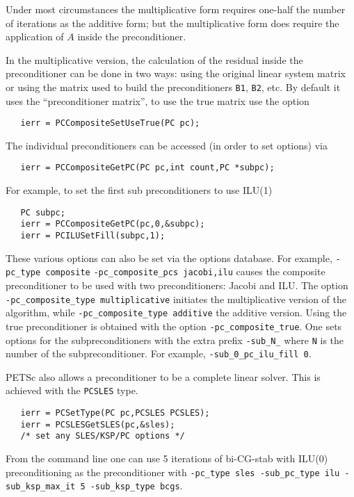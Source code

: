 Under most circumstances the multiplicative form requires one-half the number of
iterations as the additive form; but the multiplicative form does require 
the application of $ A $ inside the preconditioner. 

In the multiplicative version, the calculation of the residual inside the 
preconditioner can be done in two ways: using the original linear system matrix
or using the matrix used to build the preconditioners {\tt B1}, {\tt B2}, etc.
By default it uses the ``preconditioner matrix'', to use the true matrix use the 
option 
\begin{verbatim}
   ierr = PCCompositeSetUseTrue(PC pc);
\end{verbatim}

The individual 
preconditioners can be accessed (in order to set options) via
\begin{verbatim}
   ierr = PCCompositeGetPC(PC pc,int count,PC *subpc);
\end{verbatim}
For example, to set the first sub preconditioners to use ILU(1)
\begin{verbatim}
   PC subpc;
   ierr = PCCompositeGetPC(pc,0,&subpc);
   ierr = PCILUSetFill(subpc,1);
\end{verbatim}

These various options can also be set via the options database. For example,
{\tt -pc\_type composite}  {\tt -pc\_composite\_pcs jacobi,ilu}
 causes the composite preconditioner to be used with 
two preconditioners: Jacobi and ILU. The option {\tt -pc\_composite\_type multiplicative}
 initiates the multiplicative version of the algorithm,
while {\tt -pc\_composite\_type additive} the additive version. Using the true
preconditioner is obtained with the option {\tt -pc\_composite\_true}. 
 One sets options for the subpreconditioners with the 
extra prefix {\tt -sub\_N\_} where {\tt N} is the number of the subpreconditioner.
For example, {\tt -sub\_0\_pc\_ilu\_fill 0}.


PETSc also allows a preconditioner to be a complete linear solver. This is 
achieved with the {\tt PCSLES} type. 
\begin{verbatim}
   ierr = PCSetType(PC pc,PCSLES PCSLES);
   ierr = PCSLESGetSLES(pc,&sles);
   /* set any SLES/KSP/PC options */
\end{verbatim}
 From the command line one can use 5 iterations of 
bi-CG-stab with ILU(0) preconditioning as the preconditioner with 
{\tt -pc\_type sles -sub\_pc\_type ilu -sub\_ksp\_max\_it 5 -sub\_ksp\_type bcgs}. 

